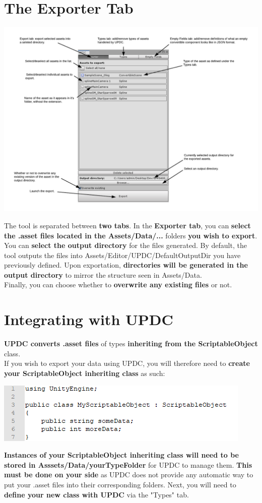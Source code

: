 \documentclass[10pt,a4paper]{article}
\begin{document}
\section{The Exporter Tab}
\begin{center}
\includegraphics[scale=0.55]{exportUi}
\end{center}
The tool is separated between \textbf{two tabs}. In the \textbf{Exporter tab}, you can \textbf{select the .asset files located in the Assets/Data/...} folders \textbf{you wish to export}.
You can \textbf{select the output directory} for the files generated. By default, the tool outputs the files into Assets/Editor/UPDC/DefaultOutputDir you have previously defined.
Upon exportation, \textbf{directories will be generated in the output directory} to mirror the structure seen in Assets/Data.\\
Finally, you can choose whether to \textbf{overwrite any existing files} or not.
\newpage

\section{Integrating with UPDC}
\textbf{UPDC converts .asset files} of types \textbf{inheriting from the ScriptableObject} class.\\
If you wish to export your data using UPDC, you will therefore need to \textbf{create your ScriptableObject inheriting class} as such:
\begin{center}
\includegraphics[scale=1.0]{soExample}
\end{center}
\textbf{Instances of your ScriptableObject inheriting class will need to be stored in Asssets/Data/yourTypeFolder} for UPDC to manage them. \textbf{This must be done on your side} as UPDC does not provide any automatic way to put your .asset files into their corresponding folders.
Next, you will need to \textbf{define your new class with UPDC} via the "Types" tab.
\end{document}

